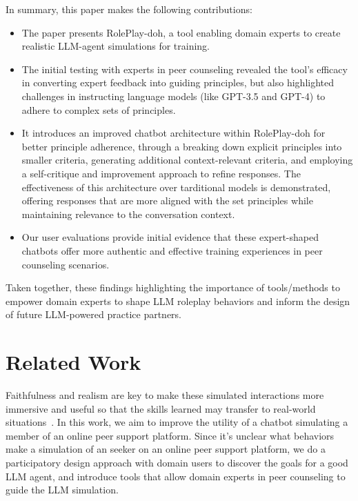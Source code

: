 In summary, this paper makes the following contributions:
\begin{itemize}
    \item The paper presents RolePlay-doh, a tool enabling domain experts to create realistic LLM-agent simulations for training.
    \item The initial testing with experts in peer counseling revealed the tool's efficacy in converting expert feedback into guiding principles, but also highlighted challenges in instructing language models (like GPT-3.5 and GPT-4) to adhere to complex sets of principles.
    \item It introduces an improved chatbot architecture within RolePlay-doh for better principle adherence, through a breaking down explicit principles into smaller criteria, generating additional context-relevant criteria, and employing a self-critique and improvement approach to refine responses. The effectiveness of this architecture over tarditional models is demonstrated, offering responses that are more aligned with the set principles while maintaining relevance to the conversation context.
    \item Our user evaluations provide initial evidence that these expert-shaped chatbots offer more authentic and  effective training experiences in peer counseling scenarios.
\end{itemize}

Taken together, these findings highlighting the importance of tools/methods to empower domain experts to shape LLM roleplay behaviors and inform the design of future LLM-powered practice partners.

\section{Related Work}

Faithfulness and realism are key to make these simulated interactions more immersive and useful so that the skills learned may transfer to real-world situations~\cite{alinier2022simulation}. 
In this work, we aim to improve the utility of a chatbot simulating a member of an online peer support platform. Since it's unclear what behaviors make a simulation of an seeker on an online peer support platform, we do a participatory design approach with domain users to discover the goals for a good LLM agent, and introduce tools that allow domain experts in peer counseling to guide the LLM simulation.
\fi


